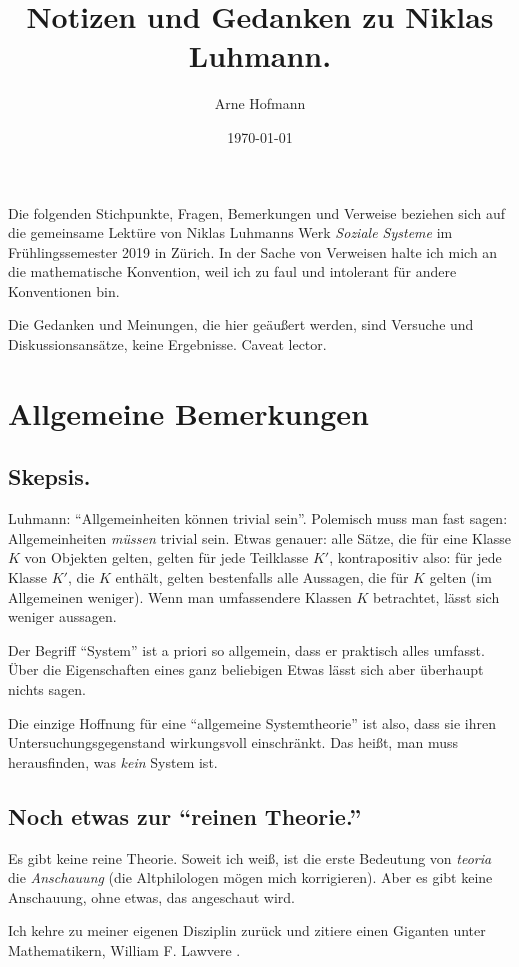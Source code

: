 \documentclass[a4paper, 10pt]{amsart}
\begin{document}
\title{Notizen und Gedanken zu Niklas Luhmann.}
\author{Arne Hofmann}
\date{\today}
\maketitle
\tableofcontents
Die folgenden Stichpunkte, Fragen, Bemerkungen und Verweise beziehen sich auf die gemeinsame Lektüre von Niklas Luhmanns Werk \emph{Soziale Systeme} \cite{luhmann1984soziale} im Früh\-lings\-se\-mes\-ter 2019 in Zürich. In der Sache von Verweisen halte ich mich an die mathematische Konvention, weil ich zu faul und intolerant für andere Konventionen bin.

Die Gedanken und Meinungen, die hier geäußert werden, sind Versuche und Diskussionsansätze, keine Ergebnisse. Caveat lector.
\section{Allgemeine Bemerkungen}
\subsection{Skepsis.}
Luhmann: ``Allgemeinheiten können trivial sein''. Polemisch muss man fast sagen: Allgemeinheiten \emph{m\"ussen} trivial sein. Etwas genauer: alle Sätze, die für eine Klasse $K$ von Objekten gelten, gelten für jede Teilklasse $K'$, kontrapositiv also: für jede Klasse $K'$, die $K$ enthält, gelten bestenfalls alle Aussagen, die für $K$ gelten (im Allgemeinen weniger). Wenn man umfassendere Klassen $K$ betrachtet, lässt sich weniger aussagen.

Der Begriff ``System'' ist a priori so allgemein, dass er praktisch alles umfasst. Über die Eigenschaften eines ganz beliebigen Etwas lässt sich aber überhaupt nichts sagen.

Die einzige Hoffnung für eine ``allgemeine Systemtheorie'' ist also, dass sie ihren Untersuchungsgegenstand wirkungsvoll einschränkt. Das heißt, man muss herausfinden, was \emph{kein} System ist.
\subsection{Noch etwas zur ``reinen Theorie.''}
\label{sec:reine-theorie}
Es gibt keine reine Theorie. Soweit ich weiß, ist die erste Bedeutung von \emph{teoria} die \emph{Anschauung} (die Altphilologen mögen mich korrigieren). Aber es gibt keine Anschauung, ohne etwas, das angeschaut wird.

Ich kehre zu meiner eigenen Disziplin zurück und zitiere einen Giganten unter Mathematikern, William F. Lawvere \cite{InterviewWilliamLawvere}.
\end{document}

